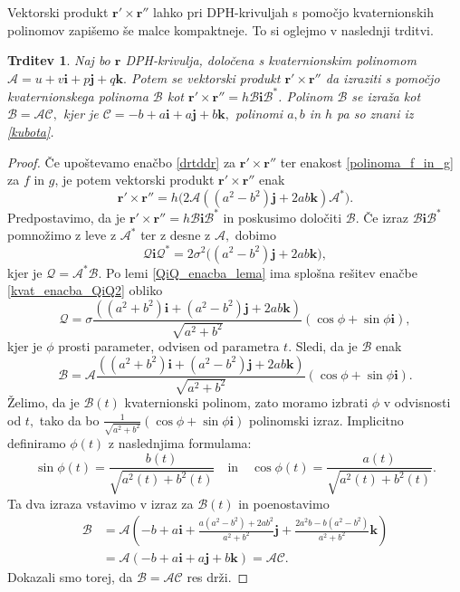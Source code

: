 \documentclass[12pt,a4paper,twoside]{article}
\theoremstyle{definition} %
\theoremstyle{plain} %
\newtheorem{trditev}[definicija]{Trditev}
\theoremstyle{primerstyle}
\numberwithin{equation}{section}  %
\newcommand{\rV}{\mathbf{r}}
\newcommand{\iV}{\mathbf{i}}
\newcommand{\jV}{\mathbf{j}}
\newcommand{\kV}{\mathbf{k}}
\newcommand{\AQ}{\mathcal{A}}
\newcommand{\BQ}{\mathcal{B}}
\newcommand{\CQ}{\mathcal{C}}
\newcommand{\QQ}{\mathcal{Q}}
\begin{document}
Vektorski produkt $\rV'\times\rV''$ lahko pri DPH-krivuljah s pomočjo kvaternionskih polinomov zapišemo še malce kompaktneje. To si oglejmo v naslednji trditvi.
\begin{trditev}
	\label{drtddr_za_DPH}
	Naj bo $\rV$ DPH-krivulja, določena s kvaternionskim polinomom $\AQ=u+v\iV+p\jV+q\kV.$ Potem se vektorski produkt $\rV'\times\rV''$ da izraziti s pomočjo kvaternionskega polinoma $\BQ$ kot $\rV'\times\rV''=h\BQ\iV\BQ^*$. Polinom $\BQ$ se izraža kot $\BQ=\AQ\CQ,$ kjer je $\CQ=-b+a\iV+a\jV+b\kV,$ polinomi $a,b$ in $h$ pa so znani iz \eqref{kubota}.
\end{trditev}
\begin{proof}
	Če upoštevamo enačbo \eqref{drtddr} za $\rV'\times\rV''$ ter enakost \eqref{polinoma_f_in_g} za $f$ in $g$, je potem vektorski produkt $\rV'\times\rV''$ enak
	\begin{equation}
		\rV'\times\rV''=h\big(2\AQ((a^2-b^2)\jV+2ab\kV)\AQ^*\big).
	\end{equation}
	Predpostavimo, da je $\rV'\times\rV''=h\BQ\iV\BQ^*$ in poskusimo določiti $\BQ.$ Če izraz $\BQ\iV\BQ^*$ pomnožimo z leve z $\AQ^*$ ter z desne z $\AQ,$ dobimo
	\begin{equation}
		\label{kvat_enacba_QiQ2}
		\QQ\iV\QQ^*=2\sigma^2\big((a^2-b^2)\jV+2ab\kV\big),
	\end{equation}
	kjer je $\QQ=\AQ^*\BQ.$ Po lemi \ref{QiQ_enacba_lema} ima splošna rešitev enačbe \eqref{kvat_enacba_QiQ2} obliko
	\begin{equation*}
		\QQ=\sigma\frac{((a^2+b^2)\iV+(a^2-b^2)\jV+2ab\kV)}{\sqrt{a^2+b^2}}(\cos\phi+\sin\phi\iV),
	\end{equation*}
	kjer je $\phi$ prosti parameter, odvisen od parametra $t.$ Sledi, da je $\BQ$ enak
	\begin{equation*}
		\BQ=\AQ\frac{((a^2+b^2)\iV+(a^2-b^2)\jV+2ab\kV)}{\sqrt{a^2+b^2}}(\cos\phi+\sin\phi\iV).
	\end{equation*}
	Želimo, da je $\BQ(t)$ kvaternionski polinom, zato moramo izbrati  $\phi$ v odvisnosti od $t,$ tako da bo $\frac{1}{\sqrt{a^2+b^2}}(\cos\phi+\sin\phi\iV)$ polinomski izraz. Implicitno definiramo $\phi(t)$ z naslednjima formulama:
	\begin{equation*}
		\sin\phi(t)=\frac{b(t)}{\sqrt{a^2(t)+b^2(t)}}\quad\text{in}\quad\cos\phi(t)=\frac{a(t)}{\sqrt{a^2(t)+b^2(t)}}.
	\end{equation*}
	Ta dva izraza vstavimo v izraz za $\BQ(t)$ in poenostavimo
	\begin{align*}
		\BQ&=\AQ\left(-b+a\iV+\frac{a(a^2-b^2)+2ab^2}{a^2+b^2}\jV+\frac{2a^2b-b(a^2-b^2)}{a^2+b^2}\kV\right)\\
		&=\AQ(-b+a\iV+a\jV+b\kV)=\AQ\CQ.
	\end{align*}
	Dokazali smo torej, da $\BQ=\AQ\CQ$ res drži.
\end{proof}
\end{document}
